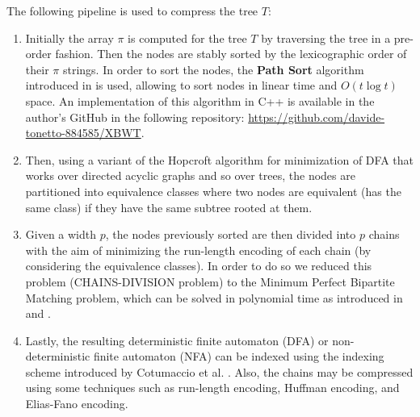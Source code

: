 The following pipeline is used to compress the tree $T$:
\begin{enumerate}
    \item Initially the array $\pi$ is computed for the tree $T$ by traversing the tree in a pre-order fashion. Then the nodes are stably sorted by the lexicographic order of their $\pi$ strings. In order to sort the nodes, the \textbf{Path Sort} algorithm introduced in \cite{ferragina2009compressing} is used, allowing to sort nodes in linear time and $O(t \log t)$ space. An implementation of this algorithm in C++ is available in the author's GitHub in the following repository: \url{https://github.com/davide-tonetto-884585/XBWT}.
    \item Then, using a variant of the Hopcroft algorithm for minimization of DFA \cite{HOPCROFT1971189} that works over directed acyclic graphs \cite{revuz1992minimisation} and so over trees, the nodes are partitioned into equivalence classes where two nodes are equivalent (has the same class) if they have the same subtree rooted at them.
    \item Given a width $p$, the nodes previously sorted are then divided into $p$ chains with the aim of minimizing the run-length encoding of each chain (by considering the equivalence classes). In order to do so we reduced this problem (\textsc{CHAINS-DIVISION} problem) to the Minimum Perfect Bipartite Matching problem, which can be solved in polynomial time as introduced in \cite{chen2022maximum} and \cite{sankowski2009maximum}.
    \item Lastly, the resulting deterministic finite automaton (DFA) or non-deterministic finite automaton (NFA) can be indexed using the indexing scheme introduced by Cotumaccio et al. \cite{cotumaccio2023co}. Also, the chains may be compressed using some techniques such as run-length encoding, Huffman encoding, and Elias-Fano encoding.
\end{enumerate}